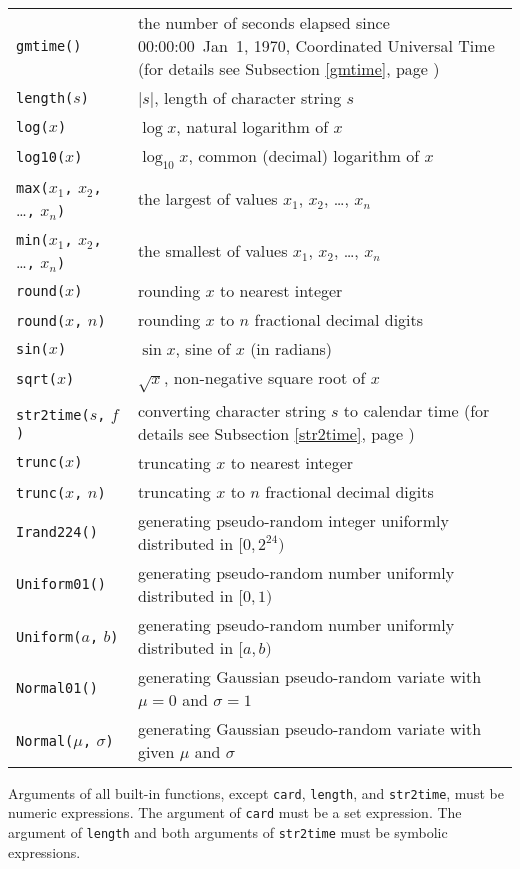\documentclass[10pt]{article}
\begin{document}
\begin{tabular}{@{}p{96pt}p{222pt}@{}}
{\tt gmtime()}&the number of seconds elapsed since 00:00:00~Jan~1, 1970,
Coordinated Universal Time (for details see Subsection \ref{gmtime},
page \pageref{gmtime})\\
{\tt length(}$s${\tt)}&$|s|$, length of character string $s$\\
{\tt log(}$x${\tt)}&$\log x$, natural logarithm of $x$\\
{\tt log10(}$x${\tt)}&$\log_{10}x$, common (decimal) logarithm of $x$\\
{\tt max(}$x_1${\tt,} $x_2${\tt,} \dots{\tt,} $x_n${\tt)}&the largest
of values $x_1$, $x_2$, \dots, $x_n$\\
{\tt min(}$x_1${\tt,} $x_2${\tt,} \dots{\tt,} $x_n${\tt)}&the smallest
of values $x_1$, $x_2$, \dots, $x_n$\\
{\tt round(}$x${\tt)}&rounding $x$ to nearest integer\\
{\tt round(}$x${\tt,} $n${\tt)}&rounding $x$ to $n$ fractional decimal
digits\\
{\tt sin(}$x${\tt)}&$\sin x$, sine of $x$ (in radians)\\
{\tt sqrt(}$x${\tt)}&$\sqrt{x}$, non-negative square root of $x$\\
{\tt str2time(}$s${\tt,} $f${\tt)}&converting character string $s$ to
calendar time (for details see Subsection \ref{str2time}, page
\pageref{str2time})\\
{\tt trunc(}$x${\tt)}&truncating $x$ to nearest integer\\
{\tt trunc(}$x${\tt,} $n${\tt)}&truncating $x$ to $n$ fractional
decimal digits\\
{\tt Irand224()}&generating pseudo-random integer uniformly distributed
in $[0,2^{24})$\\
{\tt Uniform01()}&generating pseudo-random number uniformly distributed
in $[0,1)$\\
{\tt Uniform(}$a${\tt,} $b${\tt)}&generating pseudo-random number
uniformly distributed in $[a,b)$\\
{\tt Normal01()}&generating Gaussian pseudo-random variate with
$\mu=0$ and $\sigma=1$\\
{\tt Normal(}$\mu${\tt,} $\sigma${\tt)}&generating Gaussian
pseudo-random variate with given $\mu$ and $\sigma$\\
\end{tabular}

\medskip

Arguments of all built-in functions, except {\tt card}, {\tt length},
and {\tt str2time}, must be numeric expressions. The argument of
{\tt card} must be a set expression. The argument of {\tt length} and
both arguments of {\tt str2time} must be symbolic expressions.
\end{document}
